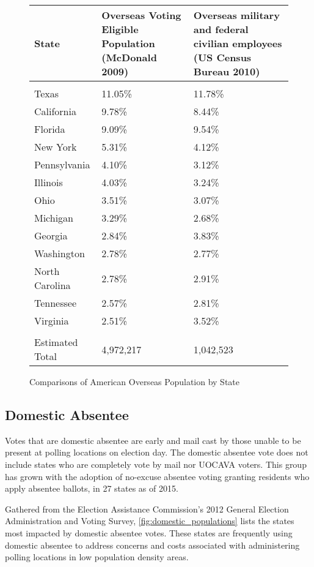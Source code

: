 \begin{figure}
\begin{center}
\begin{tabular}{l p{} p{}} %
  {\bf State} & 
  {\bf Overseas Voting Eligible \newline Population} \newline(McDonald 2009) & 
  {\bf Overseas military and federal \newline civilian employees} 
  \newline(US Census Bureau 2010)\\\hline\\
Texas & 11.05\% & 11.78\%\\
California & 9.78\% & 8.44\% \\
Florida & 9.09\% & 9.54\% \\
New York & 5.31\% & 4.12\% \\
Pennsylvania & 4.10\% & 3.12\% \\
Illinois & 4.03\% & 3.24\% \\
Ohio & 3.51\% & 3.07\% \\
Michigan & 3.29\% & 2.68\% \\
Georgia & 2.84\% & 3.83\% \\
Washington & 2.78\% & 2.77\% \\
North Carolina & 2.78\% & 2.91\% \\
Tennessee & 2.57\% & 2.81\% \\
Virginia & 2.51\% & 3.52\% \\\hline\\
Estimated Total & 4,972,217 & 1,042,523
\end{tabular}
\end{center}
\caption{Comparisons of American Overseas Population by State}
\label{fig:uocava_populations}
\end{figure}

\subsection{Domestic Absentee}
Votes that are domestic absentee are early and mail cast by those unable to be
present at polling locations on election day. The domestic absentee vote does
not include states who are completely vote by mail nor UOCAVA voters. This
group has grown with the adoption of no-excuse absentee voting granting
residents who apply absentee ballots, in 27 states as of 2015.

Gathered from the Election Assistance Commission's 2012 General Election
Administration and Voting Survey, \autoref{fig:domestic_populations} lists the
states most impacted by domestic absentee votes. These states are frequently
using domestic absentee to address concerns and costs associated with
administering polling locations in low population density areas.

